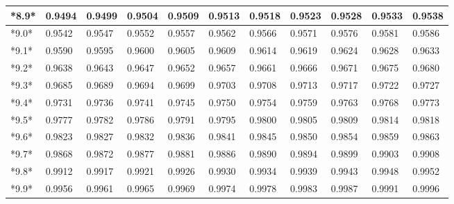 \documentclass[margin=0.5in]{article}
\begin{document}
\begin{center}
\begin{tabular}{|l|l|l|l|l|l|l|l|l|l|l|}
\hline
*8.9* & 0.9494 & 0.9499 & 0.9504 & 0.9509 & 0.9513 & 0.9518 & 0.9523 & 0.9528 & 0.9533 & 0.9538 \\
\hline
*9.0* & 0.9542 & 0.9547 & 0.9552 & 0.9557 & 0.9562 & 0.9566 & 0.9571 & 0.9576 & 0.9581 & 0.9586 \\
\hline
*9.1* & 0.9590 & 0.9595 & 0.9600 & 0.9605 & 0.9609 & 0.9614 & 0.9619 & 0.9624 & 0.9628 & 0.9633 \\
\hline
*9.2* & 0.9638 & 0.9643 & 0.9647 & 0.9652 & 0.9657 & 0.9661 & 0.9666 & 0.9671 & 0.9675 & 0.9680 \\
\hline
*9.3* & 0.9685 & 0.9689 & 0.9694 & 0.9699 & 0.9703 & 0.9708 & 0.9713 & 0.9717 & 0.9722 & 0.9727 \\
\hline
*9.4* & 0.9731 & 0.9736 & 0.9741 & 0.9745 & 0.9750 & 0.9754 & 0.9759 & 0.9763 & 0.9768 & 0.9773 \\
\hline
*9.5* & 0.9777 & 0.9782 & 0.9786 & 0.9791 & 0.9795 & 0.9800 & 0.9805 & 0.9809 & 0.9814 & 0.9818 \\
\hline
*9.6* & 0.9823 & 0.9827 & 0.9832 & 0.9836 & 0.9841 & 0.9845 & 0.9850 & 0.9854 & 0.9859 & 0.9863 \\
\hline
*9.7* & 0.9868 & 0.9872 & 0.9877 & 0.9881 & 0.9886 & 0.9890 & 0.9894 & 0.9899 & 0.9903 & 0.9908 \\
\hline
*9.8* & 0.9912 & 0.9917 & 0.9921 & 0.9926 & 0.9930 & 0.9934 & 0.9939 & 0.9943 & 0.9948 & 0.9952 \\
\hline
*9.9* & 0.9956 & 0.9961 & 0.9965 & 0.9969 & 0.9974 & 0.9978 & 0.9983 & 0.9987 & 0.9991 & 0.9996 \\
\hline
\end{tabular}
\end{center}
\end{document}
